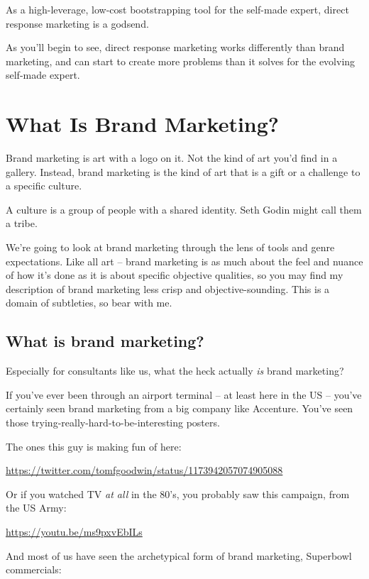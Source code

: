 \documentclass[13pt,]{tufte-handout}
\begin{document}
As a high-leverage, low-cost bootstrapping tool for the self-made
expert, direct response marketing is a godsend.

As you'll begin to see, direct response marketing works differently than
brand marketing, and can start to create more problems than it solves
for the evolving self-made expert.

\hypertarget{what-is-brand-marketing}{%
\section{What Is Brand Marketing?}\label{what-is-brand-marketing}}

Brand marketing is art with a logo on it. Not the kind of art you'd find
in a gallery. Instead, brand marketing is the kind of art that is a gift
or a challenge to a specific culture.

A culture is a group of people with a shared identity. Seth Godin might
call them a tribe.

We're going to look at brand marketing through the lens of tools and
genre expectations. Like all art -- brand marketing is as much about the
feel and nuance of how it's done as it is about specific objective
qualities, so you may find my description of brand marketing less crisp
and objective-sounding. This is a domain of subtleties, so bear with me.

\hypertarget{what-is-brand-marketing-1}{%
\subsection{What is brand marketing?}\label{what-is-brand-marketing-1}}

Especially for consultants like us, what the heck actually \emph{is}
brand marketing?

If you've ever been through an airport terminal -- at least here in the
US -- you've certainly seen brand marketing from a big company like
Accenture. You've seen those trying-really-hard-to-be-interesting
posters.

The ones this guy is making fun of here:

\url{https://twitter.com/tomfgoodwin/status/1173942057074905088}

Or if you watched TV \emph{at all} in the 80's, you probably saw this
campaign, from the US Army:

\url{https://youtu.be/ms9pxvEbILs}

And most of us have seen the archetypical form of brand marketing,
Superbowl commercials:
\end{document}
